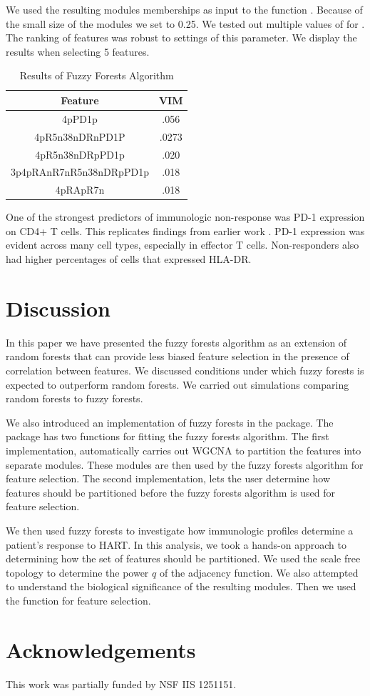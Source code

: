 \documentclass[article,shortnames]{jss}
\begin{document}
 We used the resulting modules memberships as input to the function .
Because of the small size of the modules we set  to 0.25.  We tested out multiple
values of for .  The ranking of features was robust to settings of this
parameter.   We display the results when selecting 5 features.
\begin{table}
\centering
\caption{Results of Fuzzy Forests Algorithm}
\begin{tabular}[h]{c c}
Feature & VIM\\
\hline
4pPD1p & .056\\
4pR5n38nDRnPD1P & .0273\\
4pR5n38nDRpPD1p & .020\\
3p4pRAnR7nR5n38nDRpPD1p & .018\\
4pRApR7n & .018
\end{tabular}
\end{table}

One of the strongest predictors of immunologic non-response was PD-1 expression on CD4+ T cells.
This replicates findings from earlier work \cite{hunt2008relationship}.  PD-1 expression was evident across many cell types, 
especially in effector T cells.  Non-responders also had higher percentages of cells that expressed
HLA-DR.  


\section{Discussion}
In this paper we have presented the fuzzy forests algorithm as an extension of random forests that can provide less biased feature selection in 
 the presence of correlation between features.  We discussed conditions under which fuzzy forests is expected
 to outperform random forests.  We carried out simulations comparing random forests to fuzzy forests.     
 
 We also introduced an implementation of fuzzy forests in the  package.  
 The  package has two functions for fitting the fuzzy forests algorithm.  The first implementation,  automatically 
 carries out WGCNA to partition the features into separate modules.  These modules are then used by the fuzzy forests algorithm for feature selection.
 The second implementation,  lets the user determine how features should be partitioned before the fuzzy forests algorithm is used 
 for feature selection.  
 
We then used fuzzy forests to investigate how immunologic profiles determine a patient's response to HART.
 In this analysis, we took a hands-on approach to determining how the set of features
 should be partitioned.  We used the scale free topology to determine the power $q$ of the adjacency function.
 We also attempted to understand the biological significance of the resulting modules.
 Then we used the  function for feature selection.         
 
\section*{Acknowledgements}
This work was partially funded by NSF IIS 1251151.


\end{document}
